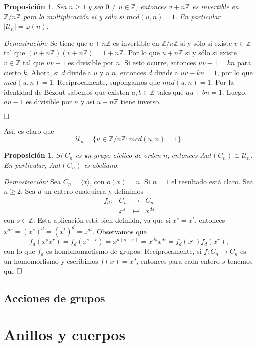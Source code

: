 \documentclass[12pt]{article}
\newtheorem{proposition}[theorem]{Proposición}
\begin{document}
\begin{proposition}Sea $n \geq 1$ y sea $0 \neq u \in \mathbb{Z}$, entonces $u + n\mathbb{Z}$ es invertible en $\mathbb{Z}/n\mathbb{Z}$ para la multiplicación si y sólo si $mcd(u,n)=1.$ En particular $|\mathcal{U}_n| = \varphi(n)$.
\end{proposition}
\emph{Demostración: }Se tiene que $u + n\mathbb{Z}$ es invertible en $\mathbb{Z}/n\mathbb{Z}$ si y sólo si existe $v \in \mathbb{Z}$ tal que $(u +n\mathbb{Z})(v+n\mathbb{Z})=1+n\mathbb{Z}$. Por lo que $u +n\mathbb{Z}$ si y sólo si existe $v \in \mathbb{Z}$ tal que $uv-1$ es divisible por $n$. Si esto ocurre, entonces $uv-1 = kn$ para cierto $k$. Ahora, si $d$ divide a $u$ y a $n$, entonces $d$ divide a $uv-kn = 1$, por lo que $mcd(u,n)=1$. Recíprocamente, supongamos que $mcd(u,n)=1$. Por la identidad de Bézout sabemos que existen $a,b \in \mathbb{Z}$ tales que $au+bn = 1$. Luego, $au-1$ es divisible por $n$ y así $u+n\mathbb{Z}$ tiene inverso.

$\hfill \square$

Así, es claro que $$\mathcal{U}_n = \lbrace u \in \mathbb{Z}/n\mathbb{Z}:mcd(u,n)=1 \rbrace.$$

\begin{proposition}Si $C_n$ es un grupo cíclico de orden $n$, entonces $Aut(C_n) \cong \mathcal{U}_n$. En particular, $Aut(C_n)$ es abeliano.
\end{proposition}
\emph{Demostración: }Sea $C_n = \langle x \rangle$, con $o(x)=n$. Si $n = 1$ el resultado está claro. Sea $n \geq 2$. Sea $d$ un entero cualquiera y definimos $$\begin{array}{rccl}
f_d \colon &C_n&\longrightarrow &C_n \\
&x^s& \longmapsto &x^{ds}
\end{array}
$$
con $s \in \mathbb{Z}$. Esta aplicación está bien definida, ya que si $x^s = x^t$, entonces $x^{ds}= (x^s)^d=(x^t)^d= x^{dt}$. Observamos que $$f_d(x^sx^r)=f_d(x^{s+r})=x^{d(s+r)} = x^{ds}x^{dr} = f_d(x^s)f_d(x^r),$$ con lo que $f_d$ es homomomorfismo de grupos. Recíprocamente, si $f \colon C_n \longrightarrow C_n$ es un homomorfismo y escribimos $f(x)=x^d$, entonces para cada entero $s$ tenemos que 
$\hfill \square$


\subsection{Acciones de grupos}

\section{Anillos y cuerpos}
\end{document}
